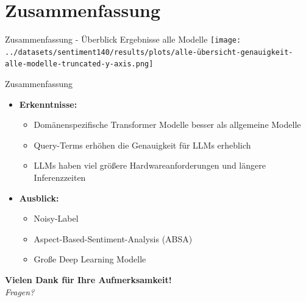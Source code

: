 \documentclass[aspectratio=169]{beamer} %
\begin{document}
\section{Zusammenfassung}

\begin{frame}{Zusammenfassung - Überblick Ergebnisse alle Modelle}
    \centering
    \texttt{[image: ../datasets/sentiment140/results/plots/alle-übersicht-genauigkeit-alle-modelle-truncated-y-axis.png]}
\end{frame}

\begin{frame}{Zusammenfassung}
  \normalsize
      \begin{itemize}
        \item \textbf{Erkenntnisse:}
        \begin{itemize}
            \item Domänenspezifische Transformer Modelle besser als allgemeine Modelle
            \item Query-Terms erhöhen die Genauigkeit für LLMs erheblich
            \item LLMs haben viel größere Hardwareanforderungen und längere Inferenzzeiten
        \end{itemize}
        \vspace{0.4cm}
        \item \textbf{Ausblick:}
        \begin{itemize}
            \item Noisy-Label
            \item Aspect-Based-Sentiment-Analysis (ABSA)
            \item Große Deep Learning Modelle
        \end{itemize}
    \end{itemize}

  \vspace{0.5cm}
  \centering
  \pause
  {\large \textbf{Vielen Dank für Ihre Aufmerksamkeit!}} \\[0.1cm]
  \textit{Fragen?}
\end{frame}
\end{document}
